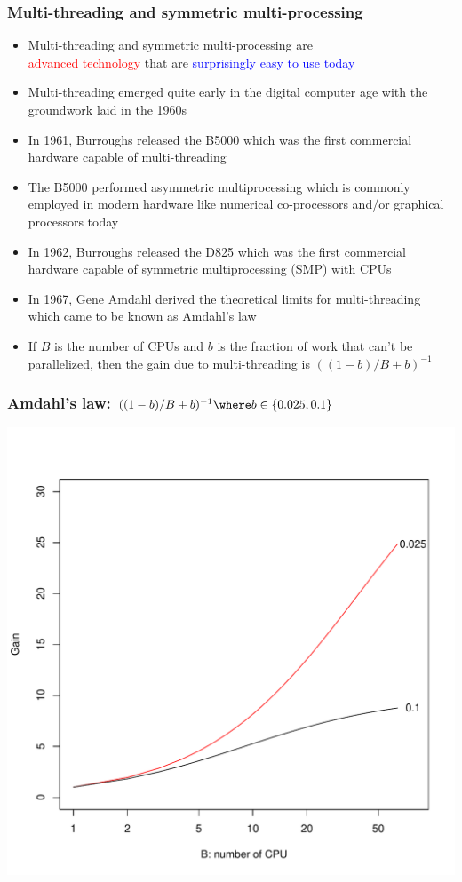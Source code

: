 \documentclass[11pt,pdftex,dvipsnames,usenames,helvetica]{beamer}
\begin{document}
\begin{frame}[fragile]
\frametitle{Multi-threading and symmetric multi-processing}

\begin{itemize}
\item Multi-threading and symmetric multi-processing are\\
\textcolor{red}{advanced technology} that are 
\textcolor{blue}{surprisingly easy to use today}
\item Multi-threading emerged quite early in the digital
  computer age with the groundwork laid in the 1960s
\item In 1961, Burroughs released the B5000 which was the first
  commercial hardware capable of multi-threading
\item The B5000 performed asymmetric multiprocessing which is commonly
  employed in modern hardware like numerical co-processors and/or
  graphical processors today
\item In 1962, Burroughs released the D825 which was the first
  commercial hardware capable of symmetric multiprocessing (SMP) with
  CPUs
\item In 1967, Gene Amdahl derived the theoretical limits for
  multi-threading which came to be known as Amdahl's law
\item If $B$ is the number of CPUs and $b$ is the fraction
of work that can't be parallelized, then the gain due to
multi-threading is $((1-b)/B+b)^{-1}$
\end{itemize}
\end{frame}

\begin{frame}[fragile]
\frametitle{Amdahl's law: $((1-b)/B+b)^{-1} \where b \in \{0.025, 0.1\}$}
\begin{center}
\includegraphics[scale=0.5]{amdahl.pdf}
\end{center}
\end{frame}
\end{document}
